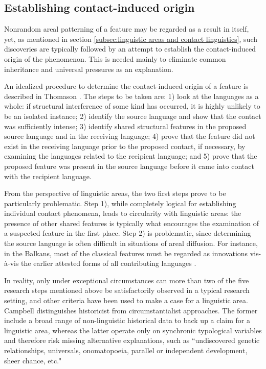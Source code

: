 \documentclass[output=paper,
modfonts
]{langscibook}
\begin{document}
\subsection{Establishing contact-induced origin} \label{sec:establishing}

Nonrandom areal patterning of a feature may be regarded as a result in itself, yet, as mentioned in section \ref{subsec:linguistic areas and contact linguistics}, such discoveries are typically followed by an attempt to establish the contact-induced origin of the phenomenon. This is needed mainly to eliminate common inheritance and universal pressures as an explanation. 

An idealized procedure to determine the contact-induced origin of a feature is described in Thomason \parencite*{thomason2010}. The steps to be taken are: 1) look at the languages as a whole: if structural interference of some kind has occurred, it is highly unlikely to be an isolated instance; 2) identify the source language and show that the contact was sufficiently intense; 3) identify shared structural features in the proposed source language and in the receiving language; 4) prove that the feature did not exist in the receiving language prior to the proposed contact, if necessary, by examining the languages related to the recipient language; and 5) prove that the proposed feature was present in the source language before it came into contact with the recipient language.

From the perspective of linguistic areas, the two first steps prove to be particularly problematic. Step 1), while completely logical for establishing individual contact phenomena, leads to circularity with linguistic areas: the presence of other shared features is typically what encourages the examination of a suspected feature in the first place. Step 2) is problematic, since determining the source language is often difficult in situations of areal diffusion. For instance, in the Balkans, most of the classical features must be regarded as innovations vis-à-vis the earlier attested forms of all contributing languages \parencite{lindstedt2018}.

In reality, only under exceptional circumstances can more than two of the five research steps mentioned above be satisfactorily observed in a typical research setting, and other criteria have been used to make a case for a linguistic area. Campbell \parencite*[31--36]{campbell1985} distinguishes historicist from circumstantialist approaches. The former include a broad range of non-linguistic historical data to back up a claim for a linguistic area, whereas the latter operate only on synchronic typological variables and therefore risk missing alternative explanations, such as ``undiscovered genetic relationships, universals, onomatopoeia, parallel or independent development, sheer chance, etc."
\end{document}
